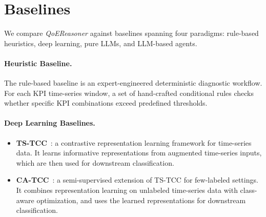 \documentclass[sigconf,10pt]{acmart} %
\begin{document}

\section{Baselines}\label{appen:baselines}
We compare \textit{QoEReasoner} against baselines spanning four paradigms: rule-based heuristics, deep learning, pure LLMs, and LLM-based agents.

\paragraph{Heuristic Baseline.}
The rule-based baseline is an expert-engineered deterministic diagnostic workflow. For each KPI time-series window, a set of hand-crafted conditional rules checks whether specific KPI combinations exceed predefined thresholds.

\paragraph{Deep Learning Baselines.}
\begin{itemize}[itemsep=0em, topsep=0em, leftmargin=1em]
    \item \textbf{TS-TCC}~\cite{eldele2021ts2vec}: a contrastive representation learning framework for time-series data. It learns informative representations from augmented time-series inputs, which are then used for downstream classification.
    
    \item \textbf{CA-TCC}~\cite{eldele2023self}: a semi-supervised extension of TS-TCC for few-labeled settings. It combines representation learning on unlabeled time-series data with class-aware optimization, and uses the learned representations for downstream classification.
\end{itemize}
\end{document}
